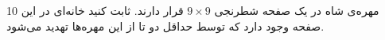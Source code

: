        10 مهره‌ی شاه در یک صفحه شطرنجی 
       $9\times9$
       قرار دارند. ثابت کنید خانه‌ای در این صفحه وجود دارد که توسط حداقل دو تا از این مهره‌ها تهدید می‌شود.
